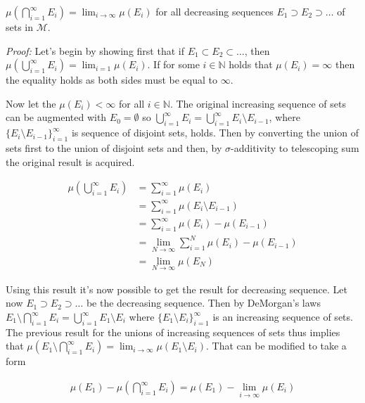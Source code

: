 \documentclass[12pt]{artikel1}
\begin{document}
\begin{proposition}[colback=white,label=prop:convergence]
    $\mu\left(\bigcap_{i=1}^\infty E_i\right)=\lim_{i\rightarrow\infty}\mu(E_i)$ for all decreasing sequences $E_1\supset E_2\supset\ldots$ of sets in $\mathcal{M}$.
\end{proposition}

\textit{Proof:} Let's begin by showing first that if $E_1\subset E_2\subset\ldots$, then $\mu\left(\bigcup_{i=1}^\infty E_i\right)=\lim_{i=1}\mu(E_i)$. If for some $i\in\mathbb{N}$ holds that $\mu(E_i)=\infty$ then the equality holds as both sides must be equal to $\infty$.

Now let the $\mu(E_i)<\infty$ for all $i\in\mathbb{N}$. The original increasing sequence of sets can be augmented with $E_0=\emptyset$ so $\bigcup_{i=1}^\infty E_i=\bigcup_{i=1}^\infty E_i\setminus E_{i-1}$, where $\{E_i\setminus E_{i-1}\}_{i=1}^\infty$ is sequence of disjoint sets, holds. Then by converting the union of sets first to the union of disjoint sets and then, by $\sigma$-additivity to telescoping sum the original result is acquired.

\begin{align*}
    \mu\left(\bigcup_{i=1}^\infty E_i \right)&=\sum_{i=1}^\infty \mu(E_i) \\
    &=\sum_{i=1}^\infty \mu(E_i\setminus E_{i-1}) \\
    &=\sum_{i=1}^\infty \mu(E_i)-\mu(E_{i-1}) \\
    &=\lim_{N\rightarrow\infty}\sum_{i=1}^N \mu(E_i)-\mu(E_{i-1}) \\
    &=\lim_{N\rightarrow\infty}\mu(E_N)
\end{align*}

Using this result it's now possible to get the result for decreasing sequence. Let now $E_1\supset E_2\supset\ldots$ be the decreasing sequence. Then by DeMorgan's laws $E_1\setminus \bigcap_{i=1}^\infty E_i=\bigcup_{i=1}^\infty E_1\setminus E_i$ where $\{E_1\setminus E_i\}_{i=1}^\infty$ is an increasing sequence of sets. The previous result for the unions of increasing sequences of sets thus implies that $\mu\left(E_1\setminus\bigcap_{i=1}^\infty E_i\right)=\lim_{i\rightarrow\infty}\mu(E_1\setminus E_i)$. That can be modified to take a form

\begin{gather*}
    \mu(E_1)-\mu\left(\bigcap_{i=1}^\infty E_i\right)=\mu(E_1)-\lim_{i\rightarrow\infty}\mu(E_i)
\end{gather*}
\end{document}
